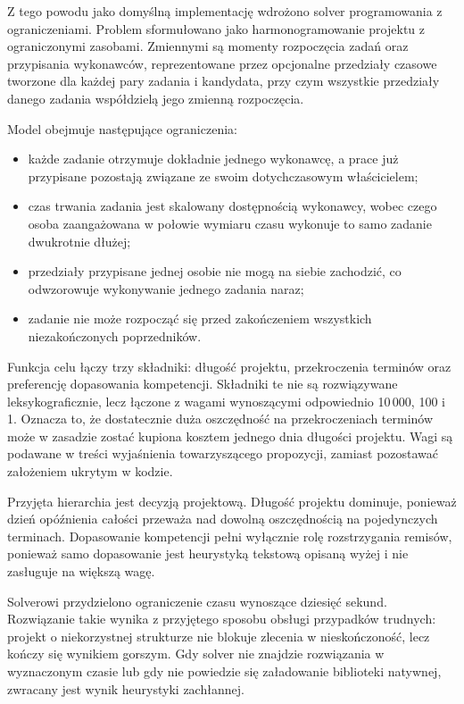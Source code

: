 Z tego powodu jako domyślną implementację wdrożono solver programowania z ograniczeniami. Problem sformułowano jako harmonogramowanie projektu z ograniczonymi zasobami. Zmiennymi są momenty rozpoczęcia zadań oraz przypisania wykonawców, reprezentowane przez opcjonalne przedziały czasowe tworzone dla każdej pary zadania i kandydata, przy czym wszystkie przedziały danego zadania współdzielą jego zmienną rozpoczęcia.

Model obejmuje następujące ograniczenia:

\begin{itemize}
    \item każde zadanie otrzymuje dokładnie jednego wykonawcę, a prace już przypisane pozostają związane ze swoim dotychczasowym właścicielem;
    \item czas trwania zadania jest skalowany dostępnością wykonawcy, wobec czego osoba zaangażowana w połowie wymiaru czasu wykonuje to samo zadanie dwukrotnie dłużej;
    \item przedziały przypisane jednej osobie nie mogą na siebie zachodzić, co odwzorowuje wykonywanie jednego zadania naraz;
    \item zadanie nie może rozpocząć się przed zakończeniem wszystkich niezakończonych poprzedników.
\end{itemize}

Funkcja celu łączy trzy składniki: długość projektu, przekroczenia terminów oraz preferencję dopasowania kompetencji. Składniki te nie są rozwiązywane leksykograficznie, lecz łączone z wagami wynoszącymi odpowiednio 10\,000, 100 i 1. Oznacza to, że dostatecznie duża oszczędność na przekroczeniach terminów może w zasadzie zostać kupiona kosztem jednego dnia długości projektu. Wagi są podawane w treści wyjaśnienia towarzyszącego propozycji, zamiast pozostawać założeniem ukrytym w kodzie.

Przyjęta hierarchia jest decyzją projektową. Długość projektu dominuje, ponieważ dzień opóźnienia całości przeważa nad dowolną oszczędnością na pojedynczych terminach. Dopasowanie kompetencji pełni wyłącznie rolę rozstrzygania remisów, ponieważ samo dopasowanie jest heurystyką tekstową opisaną wyżej i nie zasługuje na większą wagę.

Solverowi przydzielono ograniczenie czasu wynoszące dziesięć sekund. Rozwiązanie takie wynika z przyjętego sposobu obsługi przypadków trudnych: projekt o niekorzystnej strukturze nie blokuje zlecenia w nieskończoność, lecz kończy się wynikiem gorszym. Gdy solver nie znajdzie rozwiązania w wyznaczonym czasie lub gdy nie powiedzie się załadowanie biblioteki natywnej, zwracany jest wynik heurystyki zachłannej.

